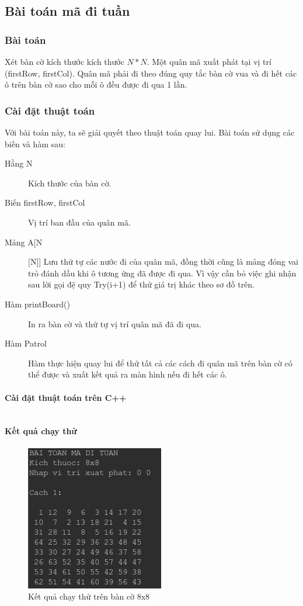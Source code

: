 \documentclass[a4paper,12pt]{report}
\newcommand{\mnt}[1]{\inputminted[frame=single, linenos=true, tabsize=4]{c++}{#1}}
\begin{document}
\subsection{Bài toán mã đi tuần}

\subsubsection{Bài toán}

Xét bàn cờ kích thước kích thước $N*N$. Một quân mã xuất phát tại vị trí (firstRow, firstCol). Quân mã phải đi theo đúng quy tắc bàn cờ vua và đi hết các ô trên bàn cờ sao cho mỗi ô đều được đi qua 1 lần.

\subsubsection{Cài đặt thuật toán}

Với bài toán này, ta sẽ giải quyết theo thuật toán quay lui. Bài toán sử dụng các biến và hàm sau:

\begin{description}
\item [Hằng N] Kích thước của bàn cờ.
\item [Biến firstRow, firstCol] Vị trí ban đầu của quân mã.
\item [Mảng A[N][N]] Lưu thứ tự các nước đi của quân mã, đồng thời cũng là mảng đóng vai trỏ đánh dầu khi ô tương ứng đã được đi qua. Vì vậy cần bỏ việc ghi nhận sau lời gọi đệ quy Try(i+1) để thử giá trị khác theo sơ đồ trên.
\item [Hàm printBoard()] In ra bàn cờ và thứ tự vị trí quân mã đã đi qua.
\item [Hàm Patrol] Hàm thực hiện quay lui để thử tất cả các cách đi quân mã trên bàn cờ có thể được và xuất kết quả ra màn hình nếu đi hết các ô.
\end{description}

\paragraph{Cài đặt thuật toán trên C++}
\mnt{src/knight.cpp}
\paragraph{Kết quả chạy thử}
\begin{figure}[htp]
\centering
\includegraphics[scale=0.50]{img/knight1.png}
\caption{Kết quả chạy thử trên bàn cờ 8x8}
\label{}
\end{figure}
\end{document}
